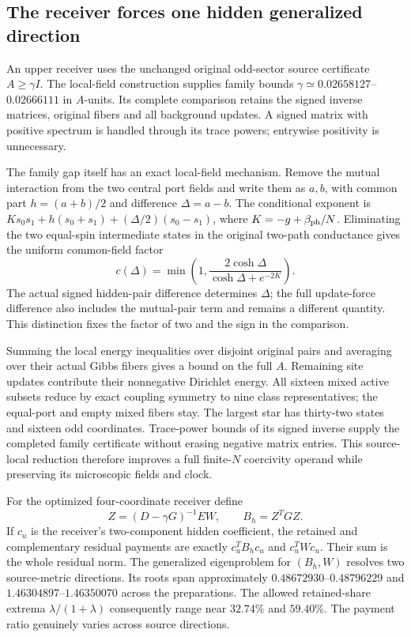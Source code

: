 \subsection{The receiver forces one hidden generalized direction}

An upper receiver uses the unchanged original odd-sector source certificate $A\geq\gamma I$. The local-field construction supplies family bounds $\gamma\simeq0.02658127$--$0.02666111$ in $A$-units. Its complete comparison retains the signed inverse matrices, original fibers and all background updates. A signed matrix with positive spectrum is handled through its trace powers; entrywise positivity is unnecessary. 

The family gap itself has an exact local-field mechanism. Remove the mutual interaction from the two central port fields and write them as $a,b$, with common part $h=(a+b)/2$ and difference $\Delta=a-b$. The conditional exponent is $Ks_0s_1+h(s_0+s_1)+(\Delta/2)(s_0-s_1)$, where $K=-g+\beta_{\rm ph}/N$. Eliminating the two equal-spin intermediate states in the original two-path conductance gives the uniform common-field factor
\[
 c(\Delta)=\min\left(1,
       \frac{2\cosh\Delta}{\cosh\Delta+e^{-2K}}\right).
\]
The actual signed hidden-pair difference determines $\Delta$; the full update-force difference also includes the mutual-pair term and remains a different quantity. This distinction fixes the factor of two and the sign in the comparison.

Summing the local energy inequalities over disjoint original pairs and averaging over their actual Gibbs fibers gives a bound on the full $A$. Remaining site updates contribute their nonnegative Dirichlet energy. All sixteen mixed active subsets reduce by exact coupling symmetry to nine class representatives; the equal-port and empty mixed fibers stay. The largest star has thirty-two states and sixteen odd coordinates. Trace-power bounds of its signed inverse supply the completed family certificate without erasing negative matrix entries. This source-local reduction therefore improves a full finite-$N$ coercivity operand while preserving its microscopic fields and clock. 

For the optimized four-coordinate receiver define
\[
 Z=(D-\gamma G)^{-1}EW,\qquad B_h=Z^TGZ.
\]
If $c_u$ is the receiver's two-component hidden coefficient, the retained and complementary residual payments are exactly $c_u^TB_hc_u$ and $c_u^TWc_u$. Their sum is the whole residual norm. The generalized eigenproblem for $(B_h,W)$ resolves two source-metric directions. Its roots span approximately $0.48672930$--$0.48796229$ and $1.46304897$--$1.46350070$ across the preparations. The allowed retained-share extrema $\lambda/(1+\lambda)$ consequently range near $32.74\%$ and $59.40\%$. The payment ratio genuinely varies across source directions. 

